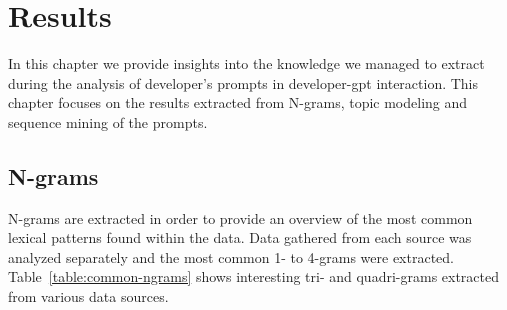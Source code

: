 \chapter{Results}\label{results}
In this chapter we provide insights into the knowledge we managed to extract during the analysis of developer's prompts in developer-\acrshort{gpt} interaction. This chapter focuses on the results extracted from N-grams, topic modeling and sequence mining of the prompts. 

\section{N-grams}\label{sec:ngrams-result}
N-grams are extracted in order to provide an overview of the most common lexical patterns found within the data. Data gathered from each source was analyzed separately and the most common 1- to 4-grams were extracted. Table~\ref{table:common-ngrams} shows interesting tri- and quadri-grams extracted from various data sources. 


